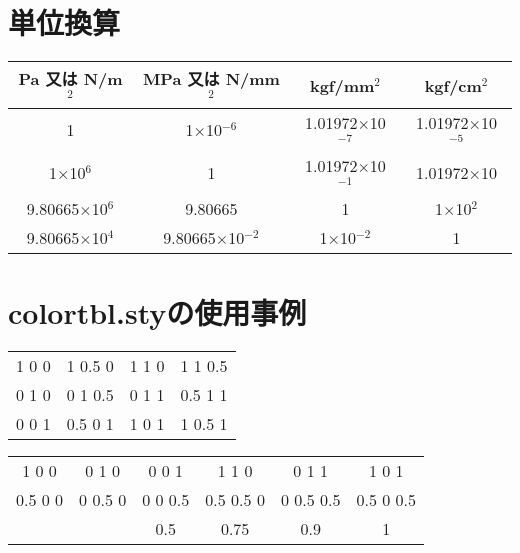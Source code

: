 \documentclass[a4paper,10pt]{jsarticle}
\begin{document}
\section{単位換算}
\begin{center}
\begin{tabular}{c|c|c|c}\hline
Pa 又は N/m$^2$       & MPa 又は N/mm$^2$        & kgf/mm$^2$               & kgf/cm$^2$               \\ \hline
1                     & 1$\times$10$^{-6}$       & 1.01972$\times$10$^{-7}$ & 1.01972$\times$10$^{-5}$ \\
1$\times$10$^6$       & 1                        & 1.01972$\times$10$^{-1}$ & 1.01972$\times$10        \\
9.80665$\times$10$^6$ & 9.80665                  & 1                        & 1$\times$10$^2$          \\
9.80665$\times$10$^4$ & 9.80665$\times$10$^{-2}$ & 1$\times$10$^{-2}$       & 1                        \\ \hline
\end{tabular}
\end{center}




\section{colortbl.styの使用事例}
\begin{tabular}{cccc}
\cellcolor[rgb]{1,0,0} 1 0 0 & \cellcolor[rgb]{1,0.5,0} 1 0.5 0 & \cellcolor[rgb]{1,1,0} 1 1 0 & \cellcolor[rgb]{1,1,0.5} 1 1 0.5 \\
\cellcolor[rgb]{0,1,0} 0 1 0 & \cellcolor[rgb]{0.5,1,0} 0 1 0.5 & \cellcolor[rgb]{0,1,1} 0 1 1 & \cellcolor[rgb]{0.5,1,1} 0.5 1 1 \\
\cellcolor[rgb]{0,0,1} 0 0 1 & \cellcolor[rgb]{0.5,0,1} 0.5 0 1 & \cellcolor[rgb]{1,0,1} 1 0 1 & \cellcolor[rgb]{1,0.5,1} 1 0.5 1 \\
\end{tabular}

\vspace{1zh}
\begin{tabular}{cccccc}
\cellcolor[rgb]{1,0,0} 1 0 0 & \cellcolor[rgb]{0,1,0} 0 1 0 & \cellcolor[rgb]{0,0,1} 0 0 1 & \cellcolor[rgb]{1,1,0} 1 1 0 & \cellcolor[rgb]{0,1,1} 0 1 1 & \cellcolor[rgb]{1,0,1} 1 0 1 \\
\cellcolor[rgb]{0.5,0,0} 0.5 0 0 & \cellcolor[rgb]{0,0.5,0} 0 0.5 0 & \cellcolor[rgb]{0,0,0.5} 0 0 0.5 & \cellcolor[rgb]{0.5,0.5,0} 0.5 0.5 0 & \cellcolor[rgb]{0,0.5,0.5} 0 0.5 0.5 & \cellcolor[rgb]{0.5,0,0.5} 0.5 0 0.5 \\
\cellcolor[gray]{0} \textcolor{white}{0} & \cellcolor[gray]{0.25} \textcolor{white}{0.25} & \cellcolor[gray]{0.5} 0.5 & \cellcolor[gray]{0.75} 0.75 & \cellcolor[gray]{0.9} 0.9 & \cellcolor[gray]{1} 1 \\
\end{tabular}
\end{document}
